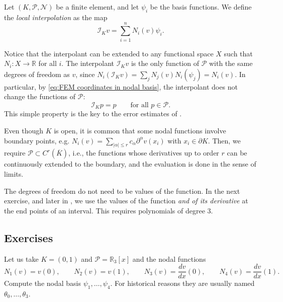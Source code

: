 \begin{definition}
    Let $(K, \mathcal P, \mathcal N)$ be a finite element,
    and let $\psi_i$ be the basis functions. We define the \emph{local interpolation} as the map
    \begin{equation*}
        \mathcal I_K v = \sum_{i=1}^n N_i (v) \psi_i.
    \end{equation*}
\end{definition}
Notice that the interpolant can be extended to any functional space $X$ such that $N_i : X \to \mathbb R$ for all $i$.
The interpolant $\mathcal I_K v$ is the only function of $\mathcal P$ with the same degrees of freedom as $v$, since $N_i(\mathcal I_K v) = \sum_{j} N_j(v) N_i(\psi_j) = N_i(v)$.
In particular, by \eqref{eq:FEM coordinates in nodal basis}, the interpolant does not change the functions of $\mathcal P$:
\begin{equation}
    \label{eq:FEM interpolant reproduces P}
    \mathcal I_K p = p \qquad \text{for all } p \in \mathcal P.
\end{equation}
This simple property is the key to the error estimates of .

\begin{remark}
    \label{rem:FEM formalism local interpolator at boundary}
    Even though $K$ is open, it is common that some nodal functions involve boundary points, e.g. $N_i(v) = \sum_{|\alpha| \le r} c_{\alpha} \partial^{\alpha} v (x_i)$ with $x_i \in \partial K$.
    Then, we require $\mathcal P \subset C^{r}(\overline K)$, i.e., the functions whose derivatives up to order $r$ can be continuously extended to the boundary, and the evaluation is done in the sense of limits.
\end{remark}

\begin{remark}
    The degrees of freedom do not need to be values of the function.
    In the next exercise, and later in , we use the values of the function \emph{and of its derivative} at the end points of an interval. This requires polynomials of degree $3$.
\end{remark}

\subsection*{Exercises}
\begin{exercises}
     Let us take $K = (0,1)$ and $\mathcal P = \mathbb R_3[x]$
    and the nodal functions
    \begin{equation*}
        N_1 (v) = v(0), \qquad N_2(v) = v(1), \qquad N_3(v) = \frac{dv}{dx} (0), \qquad N_4(v) = \frac{dv}{dx} (1).
    \end{equation*}
    Compute the nodal basis $\psi_1, \dots, \psi_4$.
    For historical reasons they are usually named $\theta_0, \dots, \theta_3$.
\end{exercises}

